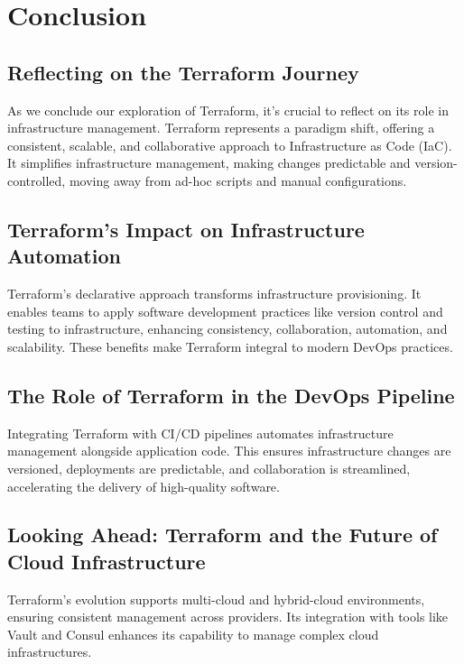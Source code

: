\chapter{Conclusion}
\sloppy

\section{Reflecting on the Terraform Journey}

As we conclude our exploration of Terraform, it's crucial to reflect on its role in infrastructure management. Terraform represents a paradigm shift, offering a consistent, scalable, and collaborative approach to Infrastructure as Code (IaC). It simplifies infrastructure management, making changes predictable and version-controlled, moving away from ad-hoc scripts and manual configurations.

\section{Terraform's Impact on Infrastructure Automation}

Terraform's declarative approach transforms infrastructure provisioning. It enables teams to apply software development practices like version control and testing to infrastructure, enhancing consistency, collaboration, automation, and scalability. These benefits make Terraform integral to modern DevOps practices.

\section{The Role of Terraform in the DevOps Pipeline}

Integrating Terraform with CI/CD pipelines automates infrastructure management alongside application code. This ensures infrastructure changes are versioned, deployments are predictable, and collaboration is streamlined, accelerating the delivery of high-quality software.

\section{Looking Ahead: Terraform and the Future of Cloud Infrastructure}

Terraform's evolution supports multi-cloud and hybrid-cloud environments, ensuring consistent management across providers. Its integration with tools like Vault and Consul enhances its capability to manage complex cloud infrastructures.

